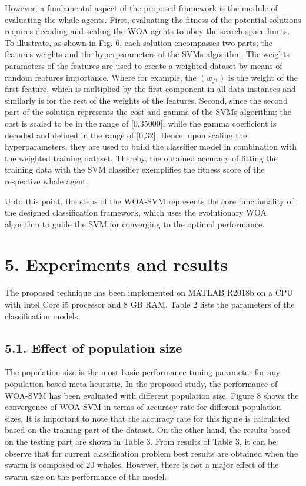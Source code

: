 \documentclass{article}
\begin{document}
However, a fundamental aspect of the proposed framework is the module of evaluating the whale agents. First, evaluating the fitness of the potential solutions requires decoding and scaling the WOA agents to obey the search space limits. To illustrate, as shown in Fig. 6, each solution encompasses two parts; the features weights and the hyperparameters of the SVMs algorithm. The weights parameters of the features are used to create a weighted dataset by means of random features importance. Where for example, the $(w_{f1})$ is the weight of the first feature, which is multiplied by the first component in all data instances and similarly is for the rest of the weights of the features. Second, since the second part of the solution represents the cost and gamma of the SVMs algorithm; the cost is scaled to be in the range of [0,35000], while the gamma coefficient is decoded and defined in the range of [0,32]. Hence, upon scaling the hyperparameters, they are used to build the classifier model in combination with the weighted training dataset. Thereby, the obtained accuracy of fitting the training data with the SVM classifier exemplifies the fitness score of the respective whale agent.

Upto this point, the steps of the WOA-SVM represents the core functionality of the designed classification framework, which uses the evolutionary WOA algorithm to guide the SVM for converging to the optimal performance.

\section{5. Experiments and results}

The proposed technique has been implemented on MATLAB R2018b on a CPU with Intel Core i5 processor and 8 GB RAM. Table 2 lists the parameters of the classification models.

\subsection{5.1. Effect of population size}

The population size is the most basic performance tuning parameter for any population based meta-heuristic. In the proposed study, the performance of WOA-SVM has been evaluated with different population size. Figure 8 shows the convergence of WOA-SVM in terms of accuracy rate for different population sizes. It is important to note that the accuracy rate for this figure is calculated based on the training part of the dataset. On the other hand, the results based on the testing part are shown in Table 3. From results of Table 3, it can be observe that for current classification problem best results are obtained when the swarm is composed of 20 whales. However, there is not a major effect of the swarm size on the performance of the model.
\end{document}

